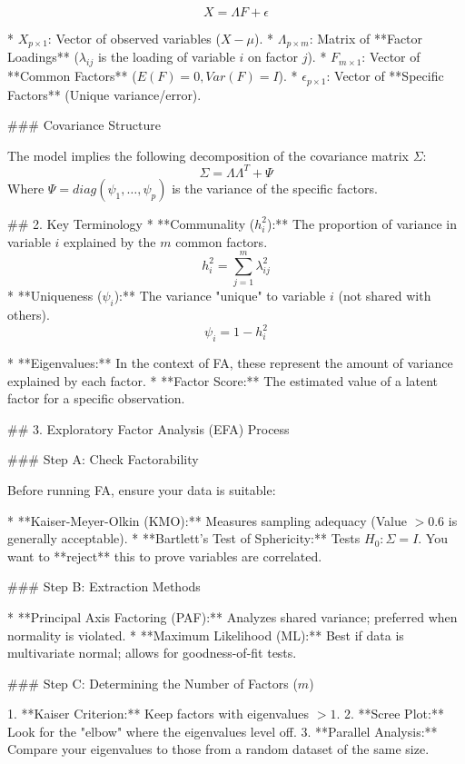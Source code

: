 \[ X = \Lambda F + \epsilon \]

* \( X_{p \times 1} \): Vector of observed variables (\( X - \mu \)).
* \( \Lambda_{p \times m} \): Matrix of **Factor Loadings** (\( \lambda_{ij} \) is the loading of variable \( i \) on factor \( j \)).
* \( F_{m \times 1} \): Vector of **Common Factors** (\( E(F)=0, Var(F)=I \)).
* \( \epsilon_{p \times 1} \): Vector of **Specific Factors** (Unique variance/error).

### Covariance Structure

The model implies the following decomposition of the covariance matrix \( \Sigma \):
\[ \Sigma = \Lambda \Lambda^T + \Psi \]
Where \( \Psi = diag(\psi_1, \dots, \psi_p) \) is the variance of the specific factors.

## 2. Key Terminology
* **Communality (\( h_i^2 \)):** The proportion of variance in variable \( i \) explained by the \( m \) common factors.
\[ h_i^2 = \sum_{j=1}^m \lambda_{ij}^2 \]
* **Uniqueness (\( \psi_i \)):** The variance "unique" to variable \( i \) (not shared with others).
\[ \psi_i = 1 - h_i^2 \]

* **Eigenvalues:** In the context of FA, these represent the amount of variance explained by each factor.
* **Factor Score:** The estimated value of a latent factor for a specific observation.

## 3. Exploratory Factor Analysis (EFA) Process

### Step A: Check Factorability

Before running FA, ensure your data is suitable:

* **Kaiser-Meyer-Olkin (KMO):** Measures sampling adequacy (Value \( > 0.6 \) is generally acceptable).
* **Bartlett’s Test of Sphericity:** Tests \( H_0: \Sigma = I \). You want to **reject** this to prove variables are correlated.

### Step B: Extraction Methods

* **Principal Axis Factoring (PAF):** Analyzes shared variance; preferred when normality is violated.
* **Maximum Likelihood (ML):** Best if data is multivariate normal; allows for goodness-of-fit tests.

### Step C: Determining the Number of Factors (\( m \))

1. **Kaiser Criterion:** Keep factors with eigenvalues \( > 1 \).
2. **Scree Plot:** Look for the "elbow" where the eigenvalues level off.
3. **Parallel Analysis:** Compare your eigenvalues to those from a random dataset of the same size.

